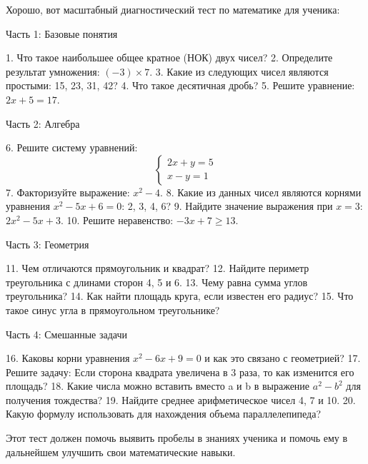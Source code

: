 \documentclass{article}
\begin{document}
Хорошо, вот масштабный диагностический тест по математике для ученика:

Часть 1: Базовые понятия

1. Что такое наибольшее общее кратное (НОК) двух чисел?
2. Определите результат умножения: \((-3) \times 7\).
3. Какие из следующих чисел являются простыми: 15, 23, 31, 42?
4. Что такое десятичная дробь?
5. Решите уравнение: \(2x + 5 = 17\).

Часть 2: Алгебра

6. Решите систему уравнений:
   \[
   \begin{cases}
   2x + y = 5 \\
   x - y = 1
   \end{cases}
   \]
7. Факторизуйте выражение: \(x^2 - 4\).
8. Какие из данных чисел являются корнями уравнения \(x^2 - 5x + 6 = 0\): 2, 3, 4, 6?
9. Найдите значение выражения при \(x = 3\): \(2x^2 - 5x + 3\).
10. Решите неравенство: \(-3x + 7 \geq 13\).

Часть 3: Геометрия

11. Чем отличаются прямоугольник и квадрат?
12. Найдите периметр треугольника с длинами сторон 4, 5 и 6.
13. Чему равна сумма углов треугольника?
14. Как найти площадь круга, если известен его радиус?
15. Что такое синус угла в прямоугольном треугольнике?

Часть 4: Смешанные задачи

16. Каковы корни уравнения \(x^2 - 6x + 9 = 0\) и как это связано с геометрией?
17. Решите задачу: Если сторона квадрата увеличена в 3 раза, то как изменится его площадь?
18. Какие числа можно вставить вместо a и b в выражение \(a^2 - b^2\) для получения тождества?
19. Найдите среднее арифметическое чисел 4, 7 и 10.
20. Какую формулу использовать для нахождения объема параллелепипеда?

Этот тест должен помочь выявить пробелы в знаниях ученика и помочь ему в дальнейшем улучшить свои математические навыки.
\end{document}
